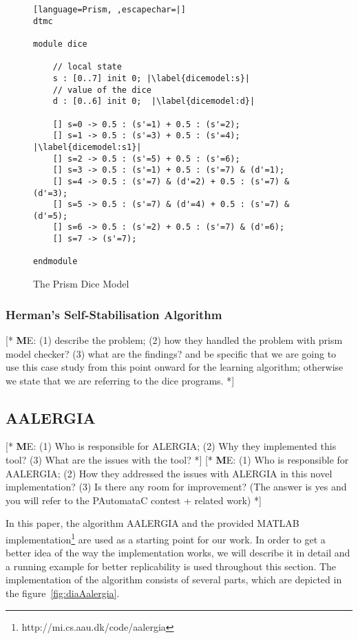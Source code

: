 \documentclass[
a4paper,
12pt
]{scrartcl}
\newcommand\me[1]{ [* {\textbf ME:} #1 *]}
\begin{document}
\begin{figure}[ht!]
\begin{lstlisting}[language=Prism, ,escapechar=|]
dtmc

module dice

	// local state
	s : [0..7] init 0; |\label{dicemodel:s}|
	// value of the dice
	d : [0..6] init 0;  |\label{dicemodel:d}|
	
	[] s=0 -> 0.5 : (s'=1) + 0.5 : (s'=2);
	[] s=1 -> 0.5 : (s'=3) + 0.5 : (s'=4); |\label{dicemodel:s1}|
	[] s=2 -> 0.5 : (s'=5) + 0.5 : (s'=6);
	[] s=3 -> 0.5 : (s'=1) + 0.5 : (s'=7) & (d'=1);
	[] s=4 -> 0.5 : (s'=7) & (d'=2) + 0.5 : (s'=7) & (d'=3);
	[] s=5 -> 0.5 : (s'=7) & (d'=4) + 0.5 : (s'=7) & (d'=5);
	[] s=6 -> 0.5 : (s'=2) + 0.5 : (s'=7) & (d'=6);
	[] s=7 -> (s'=7);
	
endmodule

\end{lstlisting}
\caption{The Prism Dice Model}
\label{fig:dicemodel}
\end{figure}

\subsubsection{Herman's Self-Stabilisation Algorithm}
\me{(1) describe the problem; (2) how they handled the problem with prism model checker? (3) what are the findings? and be specific that we are going to use this case study from this point onward for the learning algorithm; otherwise we state that we are referring to the dice programs.}
\subsection{AALERGIA}
\me{(1) Who is responsible for ALERGIA; (2) Why they implemented this tool? (3) What are the issues with the tool?}
\me{(1) Who is responsible for AALERGIA; (2) How they addressed the issues with ALERGIA in this novel implementation? (3) Is there any room for improvement? (The answer is yes and you will refer to the PAutomataC contest + related work)}

In this paper, the algorithm AALERGIA\cite{Mao.} and the provided MATLAB implementation\footnote{http://mi.cs.aau.dk/code/aalergia} are used as a starting point for our work. In order to get a better idea of the way the implementation works, we will describe it in detail and a running example for better replicability is used throughout this section. The implementation of the algorithm consists of several parts, which are depicted in the figure~\ref{fig:diaAalergia}.
\end{document}
